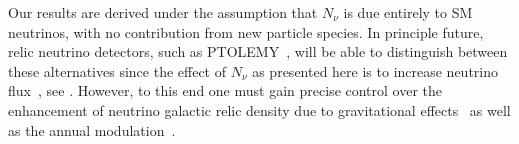 Our results are derived under the assumption that $N_\nu$ is due entirely to SM neutrinos, with no contribution from new particle species. In principle future, relic neutrino detectors, such as PTOLEMY~\cite{PTOLEMY}, will be able to distinguish between these alternatives since the effect of $N_\nu$ as presented here is to increase neutrino flux~\cite{Birrell:2013_2}, see . However, to this end one must gain precise control over the enhancement of neutrino galactic relic density due to  gravitational effects~\cite{Ringwald:2004np} as well as the annual modulation~\cite{Safdi}. 

